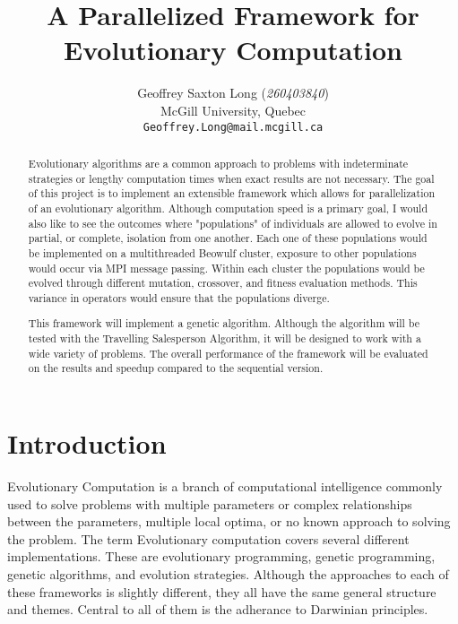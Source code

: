 \documentclass[10pt,letterpaper]{article}
\begin{document}
\title{A Parallelized Framework for Evolutionary Computation}

\author{
	Geoffrey Saxton Long (\textit{260403840})\\
	McGill University, Quebec \\
	{\tt\small Geoffrey.Long@mail.mcgill.ca}
}

\maketitle

\begin{abstract}
Evolutionary algorithms are a common approach to problems with indeterminate strategies or lengthy computation times when exact results are not necessary. The goal of this project is to implement an extensible framework which allows for parallelization of an evolutionary algorithm. Although computation speed is a primary goal, I would also like to see the outcomes where "populations" of individuals are allowed to evolve in partial, or complete, isolation from one another. Each one of these populations would be implemented on a multithreaded Beowulf cluster, exposure to other populations would occur via MPI message passing. Within each cluster the populations would be evolved through different mutation, crossover, and fitness evaluation methods. This variance in operators would ensure that the populations diverge. 

This framework will implement a genetic algorithm. Although the algorithm will be tested with the Travelling Salesperson Algorithm, it will be designed to work with a wide variety of problems. The overall performance of the framework will be evaluated on the results and speedup compared to the sequential version. 
\end{abstract}



\section{Introduction}
Evolutionary Computation is a branch of computational intelligence commonly used to solve problems with multiple parameters or complex relationships between the parameters, multiple local optima, or no known approach to solving the problem. The term Evolutionary computation covers several different implementations. These are evolutionary programming, genetic programming, genetic algorithms, and evolution strategies. Although the approaches to each of these frameworks is slightly different, they all have the same general structure and themes. Central to all of them is the adherance to Darwinian principles. 
\end{document}
